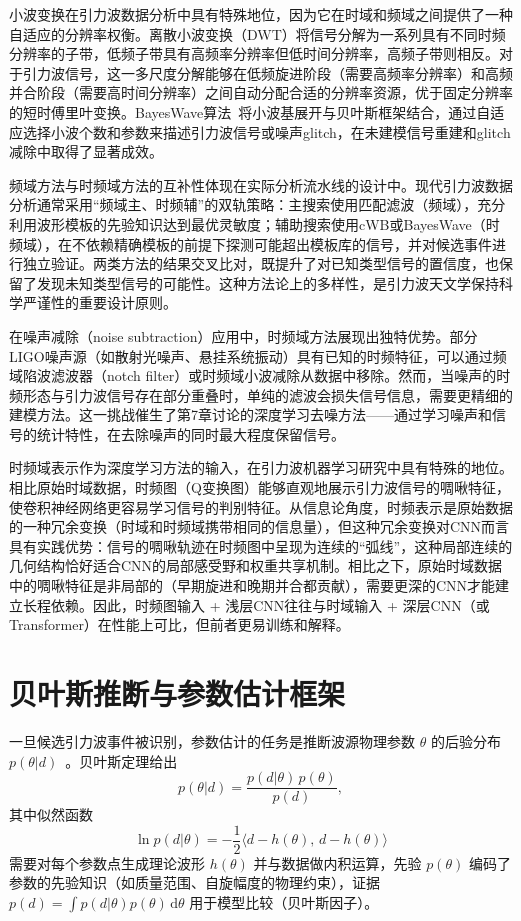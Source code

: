 小波变换在引力波数据分析中具有特殊地位，因为它在时域和频域之间提供了一种自适应的分辨率权衡。离散小波变换（DWT）将信号分解为一系列具有不同时频分辨率的子带，低频子带具有高频率分辨率但低时间分辨率，高频子带则相反。对于引力波信号，这一多尺度分解能够在低频旋进阶段（需要高频率分辨率）和高频并合阶段（需要高时间分辨率）之间自动分配合适的分辨率资源，优于固定分辨率的短时傅里叶变换。BayesWave算法~\cite{Cornish2015BayesWave}将小波基展开与贝叶斯框架结合，通过自适应选择小波个数和参数来描述引力波信号或噪声glitch，在未建模信号重建和glitch减除中取得了显著成效。

频域方法与时频域方法的互补性体现在实际分析流水线的设计中。现代引力波数据分析通常采用“频域主、时频辅”的双轨策略：主搜索使用匹配滤波（频域），充分利用波形模板的先验知识达到最优灵敏度；辅助搜索使用cWB或BayesWave（时频域），在不依赖精确模板的前提下探测可能超出模板库的信号，并对候选事件进行独立验证。两类方法的结果交叉比对，既提升了对已知类型信号的置信度，也保留了发现未知类型信号的可能性。这种方法论上的多样性，是引力波天文学保持科学严谨性的重要设计原则。

在噪声减除（noise subtraction）应用中，时频域方法展现出独特优势。部分LIGO噪声源（如散射光噪声、悬挂系统振动）具有已知的时频特征，可以通过频域陷波滤波器（notch filter）或时频域小波减除从数据中移除。然而，当噪声的时频形态与引力波信号存在部分重叠时，单纯的滤波会损失信号信息，需要更精细的建模方法。这一挑战催生了第7章讨论的深度学习去噪方法——通过学习噪声和信号的统计特性，在去除噪声的同时最大程度保留信号。

时频域表示作为深度学习方法的输入，在引力波机器学习研究中具有特殊的地位。相比原始时域数据，时频图（Q变换图）能够直观地展示引力波信号的啁啾特征，使卷积神经网络更容易学习信号的判别特征。从信息论角度，时频表示是原始数据的一种冗余变换（时域和时频域携带相同的信息量），但这种冗余变换对CNN而言具有实践优势：信号的啁啾轨迹在时频图中呈现为连续的“弧线”，这种局部连续的几何结构恰好适合CNN的局部感受野和权重共享机制。相比之下，原始时域数据中的啁啾特征是非局部的（早期旋进和晚期并合都贡献），需要更深的CNN才能建立长程依赖。因此，时频图输入 + 浅层CNN往往与时域输入 + 深层CNN（或Transformer）在性能上可比，但前者更易训练和解释。

\section{贝叶斯推断与参数估计框架}

一旦候选引力波事件被识别，参数估计的任务是推断波源物理参数 $\theta$ 的后验分布 $p(\theta|d)$~\cite{Christensen2022noise}。贝叶斯定理给出
\begin{equation}
  p(\theta|d) = \frac{p(d|\theta)\,p(\theta)}{p(d)},
\end{equation}
其中似然函数
\begin{equation}
  \ln p(d|\theta) = -\frac{1}{2}\langle d - h(\theta),\,d - h(\theta)\rangle
\end{equation}
需要对每个参数点生成理论波形 $h(\theta)$ 并与数据做内积运算，先验 $p(\theta)$ 编码了参数的先验知识（如质量范围、自旋幅度的物理约束），证据 $p(d) = \int p(d|\theta)p(\theta)\,\mathrm{d}\theta$ 用于模型比较（贝叶斯因子）。

